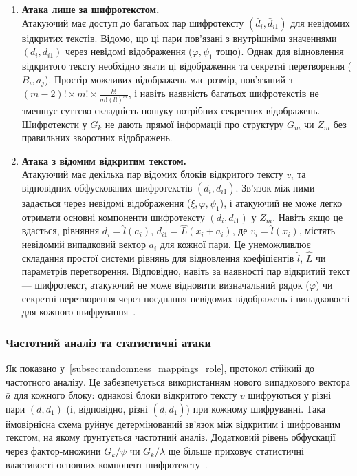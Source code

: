 \begin{enumerate}[label=(\alph*)]
    \item \textbf{Атака лише за шифротекстом.} \\
    Атакуючий має доступ до багатьох пар шифротексту $(\bar{d}_i, \bar{d}_{i1})$ для невідомих відкритих текстів. Відомо, що ці пари пов'язані з внутрішніми значеннями $(d_i, d_{i1})$ через невідомі відображення ($\varphi, \psi_1$ тощо). Однак для відновлення відкритого тексту необхідно знати ці відображення та секретні перетворення ($B_i, a_j$). Простір можливих відображень має розмір, пов'язаний з $(m-2)! \times m! \times \frac{k!}{m!(l!)^m}$, і навіть наявність багатьох шифротекстів не зменшує суттєво складність пошуку потрібних секретних відображень. Шифротексти у $G_k$ не дають прямої інформації про структуру $G_m$ чи $Z_m$ без правильних зворотних відображень.

    \item \textbf{Атака з відомим відкритим текстом.} \\
    Атакуючий має декілька пар відомих блоків відкритого тексту $v_i$ та відповідних обфускованих шифротекстів $(\bar{d}_i, \bar{d}_{i1})$. Зв'язок між ними задається через невідомі відображення ($\xi, \varphi, \psi_1$), і атакуючий не може легко отримати основні компоненти шифротексту $(d_i, d_{i1})$ у $Z_m$. Навіть якщо це вдасться, рівняння $d_i = \hat{l}(\bar{a}_i)$, $d_{i1} = \hat{L}(\bar{x}_i + \bar{a}_i)$, де $v_i = \hat{l}(\bar{x}_i)$, містять невідомий випадковий вектор $\bar{a}_i$ для кожної пари. Це унеможливлює складання простої системи рівнянь для відновлення коефіцієнтів $\hat{l}$, $\hat{L}$ чи параметрів перетворення. Відповідно, навіть за наявності пар відкритий текст — шифротекст, атакуючий не може відновити визначальний рядок ($\varphi$) чи секретні перетворення через поєднання невідомих відображень і випадковості для кожного шифрування~\cite{KatzLindell14}.
\end{enumerate}

\subsubsection{Частотний аналіз та статистичні атаки}
\label{subsubsec:frequency_analysis}
Як показано у~\ref{subsec:randomness_mappings_role}, протокол стійкий до частотного аналізу. Це забезпечується використанням нового випадкового вектора $\bar{a}$ для кожного блоку: однакові блоки відкритого тексту $v$ шифруються у різні пари $(d, d_1)$ (і, відповідно, різні $(\bar{d}, \bar{d}_1)$) при кожному шифруванні. Така ймовірнісна схема руйнує детермінований зв'язок між відкритим і шифрованим текстом, на якому ґрунтується частотний аналіз. Додатковий рівень обфускації через фактор-множини $G_k/\psi$ чи $G_k/\lambda$ ще більше приховує статистичні властивості основних компонент шифротексту~\cite{StinsonPaterson18}.

